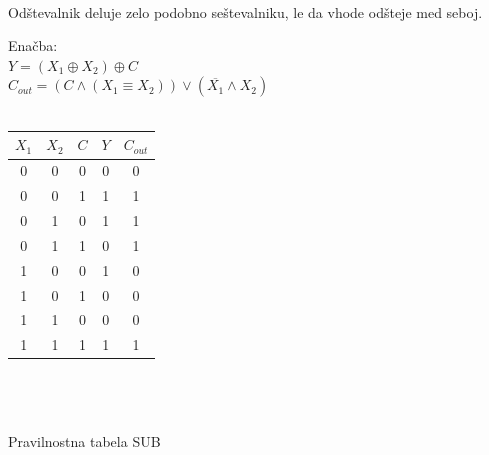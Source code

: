 \documentclass[seminar, slovene]{FRIreport}
\begin{document}
\ \\
Odštevalnik deluje zelo podobno seštevalniku, le da vhode odšteje med seboj.
\ \\
\begin{table}[H]
\begin{center}
Enačba:\\
$Y = (X_1 \oplus X_2) \oplus C$\\
$C_{out} = (C \wedge (X_1 \equiv X_2)) \vee (\overline{X_1} \wedge X_2) $\\ \ \\
\begin{tabular}{ | c | c | c || c | c | }\hline
$X_1$ & $X_2$ & $C$ & $Y$ & $C_{out}$ \\ \hline
0 & 0 & 0 & 0 & 0\\
0 & 0 & 1 & 1 & 1\\
0 & 1 & 0 & 1 & 1\\
0 & 1 & 1 & 0 & 1\\
1 & 0 & 0 & 1 & 0\\
1 & 0 & 1 & 0 & 0\\
1 & 1 & 0 & 0 & 0\\
1 & 1 & 1 & 1 & 1\\ \hline
\end{tabular}\\ \ \\ \ \\
Pravilnostna tabela SUB
\end{center}
\end{table}
\end{document}

